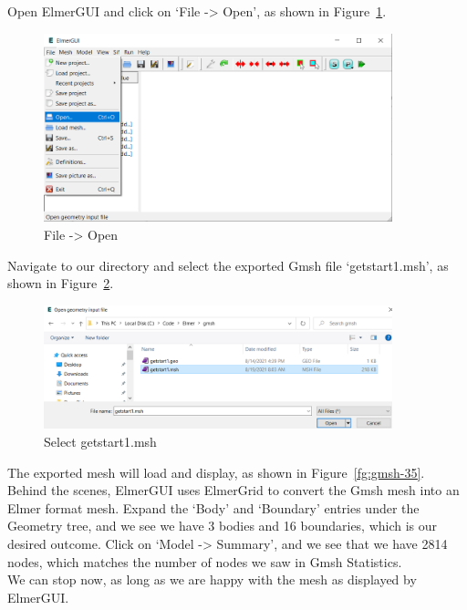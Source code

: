 Open ElmerGUI and click on `File -> Open', as shown in Figure~\ref{fg:gmsh-33}.

\begin{figure}[H]
\centering
\includegraphics[width=0.9\textwidth]{gmsh-33}
\caption{File -> Open}\label{fg:gmsh-33}
\end{figure}

Navigate to our directory and select the exported Gmsh file `getstart1.msh', as shown in Figure~\ref{fg:gmsh-34}.

\begin{figure}[H]
\centering
\includegraphics[width=0.9\textwidth]{gmsh-34}
\caption{Select getstart1.msh}\label{fg:gmsh-34}
\end{figure}

The exported mesh will load and display, as shown in Figure~\ref{fg:gmsh-35}.  Behind the scenes, ElmerGUI uses ElmerGrid to convert the Gmsh mesh into an Elmer format mesh.  Expand the `Body' and `Boundary' entries under the Geometry tree, and we see we have 3 bodies and 16 boundaries, which is our desired outcome.  Click on `Model -> Summary', and we see that we have 2814 nodes, which matches the number of nodes we saw in Gmsh Statistics.\\

We can stop now, as long as we are happy with the mesh as displayed by ElmerGUI.

